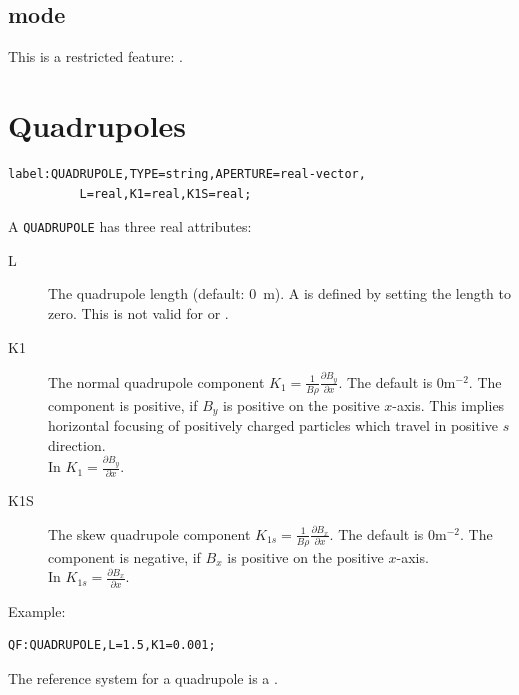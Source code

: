\subsection{\opalcycl mode}

This is a restricted feature: \noopalcycl .

\section{Quadrupoles}
\label{sec:quadrupole}
\begin{verbatim}
label:QUADRUPOLE,TYPE=string,APERTURE=real-vector,
          L=real,K1=real,K1S=real;
\end{verbatim}
A \texttt{QUADRUPOLE} has three real attributes:
\begin{description}
\item[L]
  The quadrupole length (default: 0~m).
  A  is defined by setting the length to zero. This is not valid for \opalt or \opalcycl.
\item[K1]
  The normal quadrupole component
  $K_1=\frac{1}{B \rho}\frac{\partial B_y}{\partial x}$.
  The default is $0 \mathrm{m}^{-2}$.
  The component is positive, if $B_y$ is positive on the positive $x$-axis.
  This implies horizontal focusing of positively charged particles which
  travel in positive $s$ direction.\\
  In \opalt $K_1=\frac{\partial B_y}{\partial x}$.
\item[K1S]
  The skew quadrupole component
  $K_{1s}=\frac{1}{B \rho}\frac{\partial B_x}{\partial x}$.
  The default is $0 \mathrm{m}^{-2}$.
  The component is negative, if $B_x$ is positive on the positive $x$-axis.\\
In \opalt $K_{1s}=\frac{\partial B_x}{\partial x}$.
\end{description}
\noindent Example:
\begin{verbatim}
QF:QUADRUPOLE,L=1.5,K1=0.001;
\end{verbatim}
The reference system for a quadrupole is a 
.

